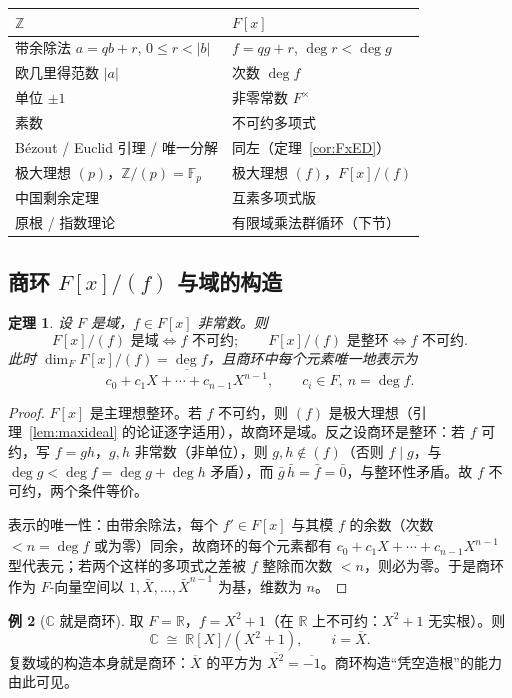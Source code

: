 \documentclass[a4paper,11pt]{ctexart}
\numberwithin{equation}{section}
\theoremstyle{plain}
\newtheorem{theorem}{定理}[section]
\theoremstyle{definition}
\newtheorem{example}[theorem]{例}
\theoremstyle{remark}
\newcommand{\Z}{\mathbb{Z}}
\newcommand{\R}{\mathbb{R}}
\newcommand{\Cc}{\mathbb{C}}
\newcommand{\F}{\mathbb{F}}
\begin{document}
\begin{center}
\renewcommand{\arraystretch}{1.35}
\begin{tabular}{ll}
\hline
$\Z$ & $F[x]$ \\
\hline
带余除法 $a=qb+r$, $0\le r<|b|$ & $f=qg+r$, $\deg r<\deg g$ \\
欧几里得范数 $|a|$ & 次数 $\deg f$ \\
单位 $\pm1$ & 非零常数 $F^{\times}$ \\
素数 & 不可约多项式 \\
Bézout / Euclid 引理 / 唯一分解 & 同左（定理~\ref{cor:FxED}） \\
极大理想 $(p)$，$\Z/(p)=\F_p$ & 极大理想 $(f)$，$F[x]/(f)$ \\
中国剩余定理 & 互素多项式版 \\
原根 / 指数理论 & 有限域乘法群循环（下节） \\
\hline
\end{tabular}
\end{center}

\subsection{商环 $F[x]/(f)$ 与域的构造}

\begin{theorem}\label{thm:quotientFx}
设 $F$ 是域，$f\in F[x]$ 非常数。则
\[
F[x]/(f) \text{ 是域} \iff f \text{ 不可约};\qquad
F[x]/(f) \text{ 是整环} \iff f \text{ 不可约}.
\]
此时 $\dim_F F[x]/(f)=\deg f$，且商环中每个元素唯一地表示为
\[
\overline{c_0+c_1X+\cdots+c_{n-1}X^{n-1}},\qquad c_i\in F,\ n=\deg f .
\]
\end{theorem}

\begin{proof}
$F[x]$ 是主理想整环。若 $f$ 不可约，则 $(f)$ 是极大理想（引理~\ref{lem:maxideal} 的论证逐字适用），故商环是域。反之设商环是整环：若 $f$ 可约，写 $f=gh$，$g,h$ 非常数（非单位），则 $g,h\notin(f)$（否则 $f\mid g$，与 $\deg g<\deg f=\deg g+\deg h$ 矛盾），而 $\bar g\,\bar h=\bar f=\bar 0$，与整环性矛盾。故 $f$ 不可约，两个条件等价。

表示的唯一性：由带余除法，每个 $f'\in F[x]$ 与其模 $f$ 的余数（次数 $<n=\deg f$ 或为零）同余，故商环的每个元素都有 $\overline{c_0+c_1X+\cdots+c_{n-1}X^{n-1}}$ 型代表元；若两个这样的多项式之差被 $f$ 整除而次数 $<n$，则必为零。于是商环作为 $F$-向量空间以 $1,\bar X,\dots,\bar X^{n-1}$ 为基，维数为 $n$。
\end{proof}

\begin{example}[$\Cc$ 就是商环]
取 $F=\R$，$f=X^2+1$（在 $\R$ 上不可约：$X^2+1$ 无实根）。则
\[
\Cc \;\cong\; \R[X]/(X^2+1),\qquad i=\overline{X}.
\]
复数域的构造本身就是商环：$\overline{X}$ 的平方为 $\overline{X^2}=\overline{-1}$。商环构造“凭空造根”的能力由此可见。
\end{example}
\end{document}

